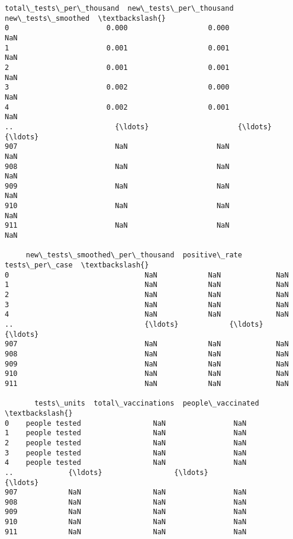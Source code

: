 \documentclass[11pt]{article}
\begin{document}
\begin{tcolorbox}[breakable, size=fbox, boxrule=.5pt, pad at break*=1mm, opacityfill=0]
\begin{Verbatim}[commandchars=\\\{\}]
     total\_tests\_per\_thousand  new\_tests\_per\_thousand  new\_tests\_smoothed  \textbackslash{}
0                       0.000                   0.000                 NaN
1                       0.001                   0.001                 NaN
2                       0.001                   0.001                 NaN
3                       0.002                   0.000                 NaN
4                       0.002                   0.001                 NaN
..                        {\ldots}                     {\ldots}                 {\ldots}
907                       NaN                     NaN                 NaN
908                       NaN                     NaN                 NaN
909                       NaN                     NaN                 NaN
910                       NaN                     NaN                 NaN
911                       NaN                     NaN                 NaN

     new\_tests\_smoothed\_per\_thousand  positive\_rate  tests\_per\_case  \textbackslash{}
0                                NaN            NaN             NaN
1                                NaN            NaN             NaN
2                                NaN            NaN             NaN
3                                NaN            NaN             NaN
4                                NaN            NaN             NaN
..                               {\ldots}            {\ldots}             {\ldots}
907                              NaN            NaN             NaN
908                              NaN            NaN             NaN
909                              NaN            NaN             NaN
910                              NaN            NaN             NaN
911                              NaN            NaN             NaN

       tests\_units  total\_vaccinations  people\_vaccinated  \textbackslash{}
0    people tested                 NaN                NaN
1    people tested                 NaN                NaN
2    people tested                 NaN                NaN
3    people tested                 NaN                NaN
4    people tested                 NaN                NaN
..             {\ldots}                 {\ldots}                {\ldots}
907            NaN                 NaN                NaN
908            NaN                 NaN                NaN
909            NaN                 NaN                NaN
910            NaN                 NaN                NaN
911            NaN                 NaN                NaN


\end{Verbatim}
\end{tcolorbox}
\end{document}
